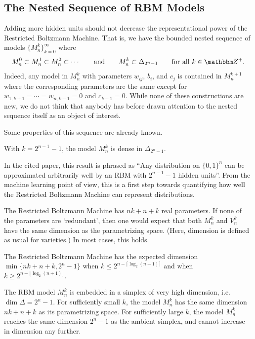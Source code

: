 \documentclass[11pt,titlepage]{article}
\numberwithin{equation}{section}
\begin{document}
\subsection{The Nested Sequence of RBM Models}

    Adding more hidden units should not decrease the representational power of
    the Restricted Boltzmann Machine.  That is, we have the bounded nested
    sequence of models $\{M_n^k\}_{k=0}^\infty$ where
    \[
        M_n^0 \subset M_n^1 \subset M_n^2 \subset \cdots 
        \qquad\text{and}\qquad
        M_n^k \subset \Delta_{2^n-1}
        \qquad\text{for all $k \in \Z^+$}.
    \]
    Indeed, any model in $M_n^k$ with parameters $w_{ij}$, $b_i$, and $c_j$ is
    contained in $M_n^{k+1}$ where the corresponding parameters are the same
    except for $w_{1,k+1} = \cdots = w_{n, k+1} = 0$  and $c_{k+1} = 0$.  While
    none of these constructions are new, we do not think that anybody has before
    drawn attention to the nested sequence itself as an object of interest.

    Some properties of this sequence are already known.
    \begin{theorem} \label{thm:approximator}
    With $k = 2^{n-1} - 1$, the model $M_n^k$ is dense in $\Delta_{2^n - 1}$.
    \end{theorem}
    In the cited paper, this result is phrased as ``Any distribution on
    $\{0,1\}^n$ can be approximated arbitrarily well by an RBM with $2^{n-1} -
    1$ hidden units''.  From the machine learning point of view, this is a first
    step towards quantifying how well the Restricted Boltzmann Machine can
    represent distributions.

    The Restricted Boltzmann Machine has $nk+n+k$ real parameters.  If none of
    the parameters are `redundant', then one would expect that both $M_n^k$ and
    $V_n^k$ have the same dimension as the parametrizing space.  (Here,
    dimension is defined as usual for varieties.) In most cases, this holds.
    \begin{theorem} \label{thm:dimension}
    The Restricted Boltzmann Machine has the expected dimension
    $\min\{nk+n+k, 2^n-1\}$ when $k \le 2^{n-\lceil \log_2(n+1)\rceil}$ and
    when $k \ge 2^{n-\lfloor\log_2(n+1)\rfloor}$.
    \end{theorem}
    \noindent The RBM model $M_n^k$ is embedded in a simplex of very high
    dimension, i.e. $\dim \Delta = 2^n-1$.  For sufficiently small $k$, the
    model $M_n^k$ has the same dimension $nk+n+k$ as its parametrizing space.
    For sufficiently large $k$, the model $M_n^k$ reaches the same dimension
    $2^n-1$ as the ambient simplex, and cannot increase in dimension any
    further.
\end{document}
